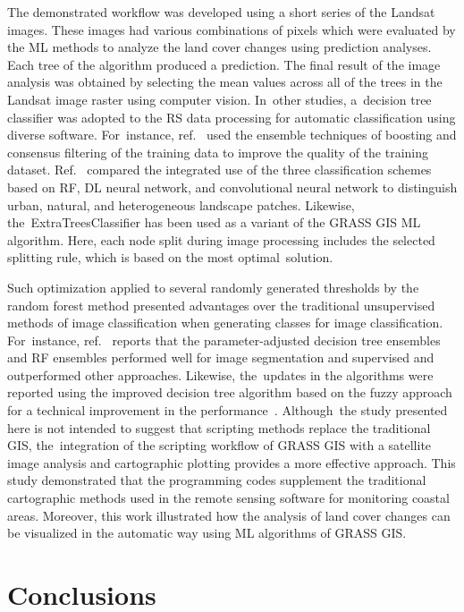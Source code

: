\documentclass[coasts,article,accept,pdftex,oneauthor]{Definitions/mdpi}
\begin{document}
{The demonstrated} workflow {was} developed using a short series of {the }Landsat images. These images had various combinations of pixels which were evaluated by the ML{ }methods to analyze{ }the land cover {changes }using prediction analyses. {Each} tree of the algorithm produced a prediction{. The} final result of the image analysis {was} obtained by selecting the mean values across all of the trees in the Landsat image raster using computer vision. In~other studies, a~decision tree classifier was adopted to {the} RS data processing for automatic classification using diverse software. For~instance, ref.~\cite{BROWNDECOLSTOUN2003316} used the ensemble techniques of boosting and consensus filtering of the training data to improve the quality of the training dataset. Ref.~\cite{VAIDYA2024101770} compared the integrated use of the three classification schemes based on RF, DL neural network, and convolutional neural network to distinguish urban, natural, and heterogeneous landscape patches. Likewise{,} the~ExtraTreesClassifier has been used as a{ }variant of the GRASS GIS ML algorithm. Here, each node split during{ }image processing includes the selected splitting rule, which is based on the most optimal~solution. 

Such optimization {applied to} several randomly generated thresholds by the random forest method {presented} advantages over the traditional unsupervised methods of image classification when generating classes for image classification. For~instance, ref.~\cite{PASQUARELLA2023103561} reports that {the} parameter-adjusted decision tree ensembles and {RF} ensembles performed well for image segmentation and supervised and outperformed other approaches. Likewise, the~{updates} in the algorithms were reported using {the }improved decision tree algorithm based on{ }the fuzzy approach{ }for a technical improvement in the{ }performance~\cite{ALOBEIDAT20151192}. Although~the study presented here is not intended to suggest that scripting methods replace the traditional GIS, the~integration of the scripting workflow of GRASS GIS with a satellite image analysis{ }and cartographic plotting provides a more effective approach. {This} study demonstrated that the programming codes{ }supplement the traditional cartographic methods used in the remote sensing software for monitoring coastal areas. Moreover, this work illustrated how the analysis of land cover changes can be visualized in the automatic way using ML algorithms of GRASS GIS. 
\section{Conclusions}
\end{document}

